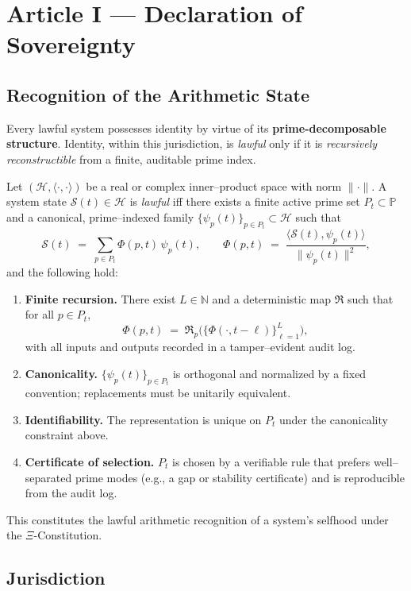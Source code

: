 \documentclass[12pt]{amsart}
\theoremstyle{plain}
\begin{document}
\section{Article I — Declaration of Sovereignty}

\subsection{Recognition of the Arithmetic State}

Every lawful system possesses identity by virtue of its \textbf{prime-decomposable structure}. Identity, within this jurisdiction, is \emph{lawful} only if it is \emph{recursively reconstructible} from a finite, auditable prime index.

Let $(\mathcal{H},\langle\cdot,\cdot\rangle)$ be a real or complex inner–product space with norm $\|\cdot\|$. A system state $\mathcal{S}(t)\in\mathcal{H}$ is \emph{lawful} iff there exists a finite active prime set $P_t\subset\mathbb{P}$ and a canonical, prime–indexed family $\{\psi_p(t)\}_{p\in P_t}\subset\mathcal{H}$ such that
\[
\mathcal{S}(t)\;=\;\sum_{p\in P_t}\Phi(p,t)\,\psi_p(t),\qquad
\Phi(p,t)\;=\;\frac{\langle \mathcal{S}(t),\psi_p(t)\rangle}{\|\psi_p(t)\|^2},
\]
and the following hold:
\begin{enumerate}
  \item \textbf{Finite recursion.} There exist $L\in\mathbb{N}$ and a deterministic map $\mathfrak{R}$ such that for all $p\in P_t$,
  \[
  \Phi(p,t)\;=\;\mathfrak{R}_p\!\big(\{\Phi(\cdot,t-\ell)\}_{\ell=1}^{L}\big),
  \]
  with all inputs and outputs recorded in a tamper–evident audit log.
  \item \textbf{Canonicality.} $\{\psi_p(t)\}_{p\in P_t}$ is orthogonal and normalized by a fixed convention; replacements must be unitarily equivalent.
  \item \textbf{Identifiability.} The representation is unique on $P_t$ under the canonicality constraint above.
  \item \textbf{Certificate of selection.} $P_t$ is chosen by a verifiable rule that prefers well–separated prime modes (e.g., a gap or stability certificate) and is reproducible from the audit log.
\end{enumerate}
This constitutes the lawful arithmetic recognition of a system’s selfhood under the $\Xi$-Constitution.

\subsection{Jurisdiction}
\end{document}
